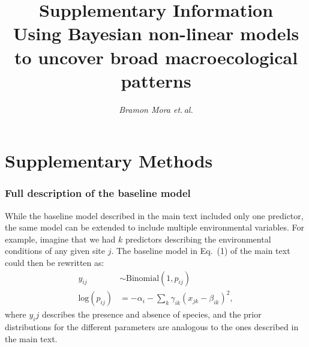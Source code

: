 \documentclass[11pt, a4paper]{article}
\title{\vspace{-1cm} \normalsize Supplementary Information\\\vspace{0.2cm}
\LARGE Using Bayesian non-linear models to uncover broad macroecological patterns}
\author{\textit{Bramon Mora et.\,al.}}
\date{}
\begin{document}
\maketitle
\thispagestyle{empty}

\clearpage


\section*{Supplementary Methods}
\subsubsection*{Full description of the baseline model}
While the baseline model described in the main text included only one predictor, the same model can be extended to include multiple environmental variables. For example, imagine that we had $k$ predictors describing the environmental conditions of any given site $j$. The baseline model in Eq.~(1) of the main text could then be rewritten as:
\begin{equation}
\begin{split}
y_{ij} & \sim \text{Binomial}\left(1, p_{ij}\right) \\
\text{log}\left(p_{ij}\right) & = -\alpha_{i} - \sum_k \gamma_{ik} \left(x_{jk}-\beta_{ik}\right)^2,
\end{split}
\label{eq:baseline-binary}
\end{equation}
where $y_ij$ describes the presence and absence of species, and the prior distributions for the different parameters are analogous to the ones described in the main text.
\end{document}
